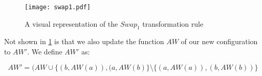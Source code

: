 \begin{figure}[H]
	\centering
	\texttt{[image: swap1.pdf]}
	\caption{A visual representation of the $Swap_1$ transformation rule}
	\label{fig:swap1}
\end{figure}

Not shown in \cref{fig:swap1} is that we also update the function $AW$ of our new configuration to $AW'$. We define $AW'$ as:

\[AW' = (AW \cup \{(b, AW(a)), (a, AW(b)\} \setminus \{(a, AW(a)), (b, AW(b))\}\]


